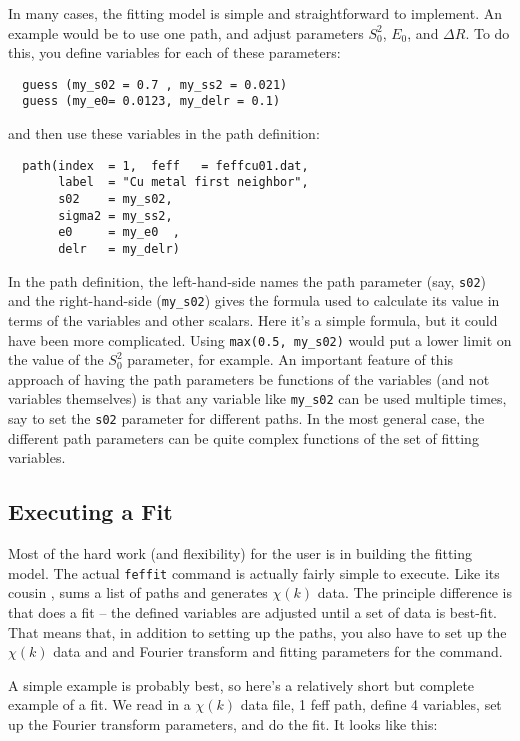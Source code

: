 In many cases, the fitting model is simple and straightforward to
implement.  An example would be to use one path, and adjust parameters
$S_0^2$, $E_0$, and $\Delta R$. To do this, you define variables  for each
of these parameters:

\begin{verbatim}
  guess (my_s02 = 0.7 , my_ss2 = 0.021)
  guess (my_e0= 0.0123, my_delr = 0.1)
\end{verbatim}
\noindent
and then use these variables in the path definition:

\begin{verbatim}
  path(index  = 1,  feff   = feffcu01.dat, 
       label  = "Cu metal first neighbor", 
       s02    = my_s02, 
       sigma2 = my_ss2, 
       e0     = my_e0  , 
       delr   = my_delr)
\end{verbatim}
\noindent
In the path definition, the left-hand-side names the path parameter (say,
{\tt{s02}}) and the right-hand-side ({\tt{my\_s02}}) gives the formula used
to calculate its value in terms of the variables and other {\ifeffit}
scalars.  Here it's a simple formula, but it could have been more
complicated.  Using {\tt{max(0.5, my\_s02)}} would put a lower limit on the
value of the $S_0^2$ parameter, for example.  An important feature of this
approach of having the path parameters be functions of the variables (and
not variables themselves) is that any variable like {\tt{my\_s02}} can be
used multiple times, say to set the {\tt{s02}} parameter for different
paths.  In the most general case, the different path parameters can be
quite complex functions of the set of fitting variables.

\subsection{Executing a Fit} \label{Ch:FEFFIT-fit}

Most of the hard work (and flexibility) for the user is in building the
fitting model.  The actual {\texttt{feffit}} command is actually fairly
simple to execute.  Like its cousin {}, {} sums a
list of paths and generates $\chi(k)$ data.  The principle difference is
that {} does a fit -- the defined variables are adjusted until a
set of data is best-fit.  That means that, in addition to setting up the
paths, you also have to set up the $\chi(k)$ data and and Fourier transform
and fitting parameters for the {} command.   
{}

A simple example is probably best, so here's a relatively short but
complete example of a fit.  We read in a $\chi(k)$ data file, 1 feff path,
define 4 variables, set up the Fourier transform parameters, and do the
fit.  It looks like this:


